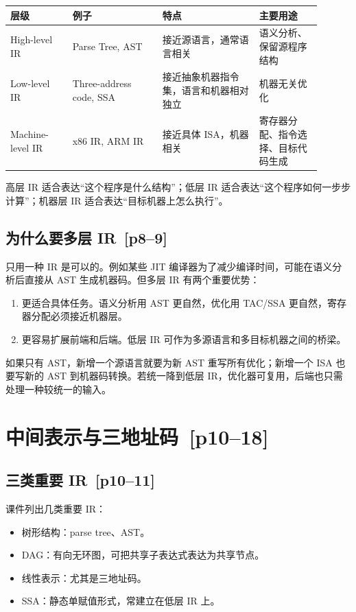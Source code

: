\documentclass[UTF8,fontset=none,11pt]{ctexart}
\newcommand{\pg}[1]{\texorpdfstring{{\small\color{graytext}\,[p#1]}}{ [p#1]}}
\begin{document}
\begin{longtable}{L{0.18\linewidth}L{0.26\linewidth}L{0.28\linewidth}L{0.18\linewidth}}
\toprule
层级 & 例子 & 特点 & 主要用途 \\
\midrule
High-level IR & Parse Tree, AST & 接近源语言，通常语言相关 & 语义分析、保留源程序结构 \\
Low-level IR & Three-address code, SSA & 接近抽象机器指令集，语言和机器相对独立 & 机器无关优化 \\
Machine-level IR & x86 IR, ARM IR & 接近具体 ISA，机器相关 & 寄存器分配、指令选择、目标代码生成 \\
\bottomrule
\end{longtable}

高层 IR 适合表达“这个程序是什么结构”；低层 IR 适合表达“这个程序如何一步步计算”；机器层 IR 适合表达“目标机器上怎么执行”。

\subsection{为什么要多层 IR \pg{8--9}}

只用一种 IR 是可以的。例如某些 JIT 编译器为了减少编译时间，可能在语义分析后直接从 AST 生成机器码。但多层 IR 有两个重要优势：

\begin{enumerate}
  \item 更适合具体任务。语义分析用 AST 更自然，优化用 TAC/SSA 更自然，寄存器分配必须接近机器层。
  \item 更容易扩展前端和后端。低层 IR 可作为多源语言和多目标机器之间的桥梁。
\end{enumerate}

如果只有 AST，新增一个源语言就要为新 AST 重写所有优化；新增一个 ISA 也要写新的 AST 到机器码转换。若统一降到低层 IR，优化器可复用，后端也只需处理一种较统一的输入。

\section{中间表示与三地址码 \pg{10--18}}

\subsection{三类重要 IR \pg{10--11}}

课件列出几类重要 IR：

\begin{itemize}
  \item 树形结构：parse tree、AST。
  \item DAG：有向无环图，可把共享子表达式表达为共享节点。
  \item 线性表示：尤其是三地址码。
  \item SSA：静态单赋值形式，常建立在低层 IR 上。
\end{itemize}
\end{document}
